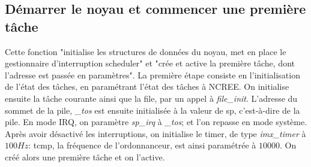 \subsection{Démarrer le noyau et commencer une première tâche}
Cette fonction "initialise les structures de données du noyau, met en place le gestionnaire d’interruption scheduler" et "crée et active la première tâche, dont l’adresse est passée en paramètres".
La première étape consiste en l'initialisation de l'état des tâches, en paramétrant l'état des tâches à NCREE. On initialise ensuite la tâche courante ainsi que la file, par un appel à \textit{file\_init}. L'adresse du sommet de la pile, \textit{\_tos} est ensuite initialisée à la valeur de sp, c'est-à-dire de la pile. En mode IRQ, on paramètre \textit{sp\_irq} à \textit{\_tos}; et l'on repasse en mode système. Après avoir désactivé les interruptions, on initialise le timer, de type \textit{imx\_timer} à $100Hz$: tcmp, la fréquence de l'ordonnanceur, est ainsi paramétrée à $10000$. On créé alors une première tâche et on l'active.
%
